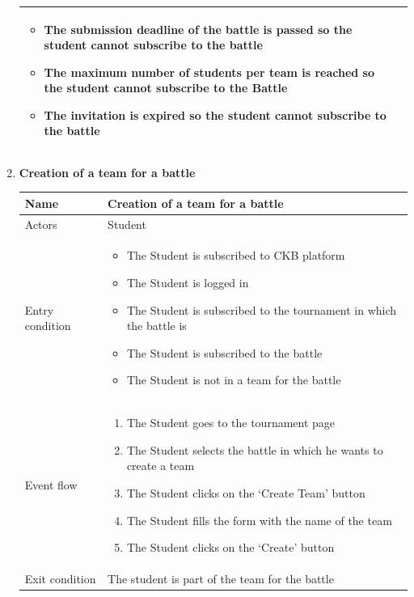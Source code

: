 \begin{enumerate}[label=UC\arabic*:]
\begin{tabular}{|p{3cm}|p{8cm}|}
\begin{itemize}
            \item The submission deadline of the battle is passed so the student cannot subscribe to the battle
            \item The maximum number of students per team is reached so the student cannot subscribe to the Battle
            \item The invitation is expired so the student cannot subscribe to the battle
        \end{itemize} \\
        \hline
    \end{tabular}
    \item \textbf{Creation of a team for a battle} \\
    \begin{tabular}{|p{3cm}|p{8cm}|}
        \hline
        Name & Creation of a team for a battle \\
        \hline
        Actors & Student \\
        \hline
        Entry condition &
        \begin{itemize}
            \item The Student is subscribed to CKB platform
            \item The Student is logged in
            \item The Student is subscribed to the tournament in which the battle is
            \item The Student is subscribed to the battle
            \item The Student is not in a team for the battle
        \end{itemize} \\
        \hline
        Event flow &
        \begin{enumerate}[label=\arabic*.]
            \item The Student goes to the tournament page
            \item The Student selects the battle in which he wants to create a team
            \item The Student clicks on the `Create Team' button
            \item The Student fills the form with the name of the team
            \item The Student clicks on the `Create' button
        \end{enumerate} \\
        \hline
        Exit condition & The student is part of the team for the battle \\

\end{tabular}
\end{enumerate}
